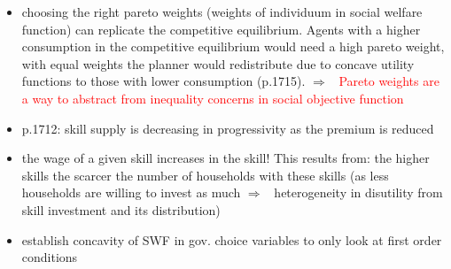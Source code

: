 \documentclass[12pt]{article}
\newcommand{\ar}{$\Rightarrow$ \ }
\newcommand{\tr}[1]{\textcolor{red}{#1}}
\begin{document}
\begin{itemize}
\item choosing the right pareto weights (weights of individuum in social welfare function) can replicate the competitive equilibrium. Agents with a higher consumption in the competitive equilibrium would need a high pareto weight, with equal weights the planner would redistribute due to concave utility functions to those with lower consumption (p.1715). \ar \tr{Pareto weights are a way to abstract from inequality concerns in social objective function }
\item p.1712:  skill supply is decreasing in progressivity as the premium is reduced
\item the wage of a given skill increases in the skill! This results from: the higher skills the scarcer the number of households with these skills (as less households are willing to invest as much \ar heterogeneity in disutility from skill investment and its distribution)
\item establish concavity of SWF in gov. choice variables to only look at first order conditions
\end{itemize}
\end{document}
